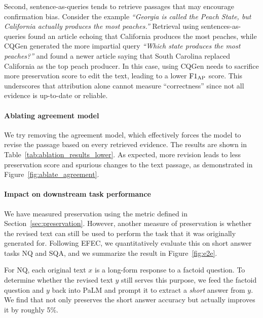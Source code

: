 Second, sentence-as-queries tends to retrieve passages that may encourage confirmation bias. 
Consider the example \textit{``Georgia is called the Peach State, but California actually produces the most peaches.''} Retrieval using sentences-as-queries found an article echoing that California produces the most peaches, while CQGen generated the more impartial query \textit{``Which state produces the most peaches?''} and found a newer article saying that South Carolina replaced California as the top peach producer. In this case, \approach{} using CQGen needs to sacrifice more preservation score to edit the text, leading to a lower $\text{F1}_\text{AP}{}$ score. This underscores that attribution alone cannot measure ``correctness'' since not all evidence is up-to-date or reliable.

\paragraph{Ablating agreement model}
We try removing the agreement model, which effectively forces the model to revise the passage based on every retrieved evidence. The results are shown in Table~\ref{tab:ablation_results_lower}. As expected, more revision leads to less preservation score and spurious changes to the text passage, as demonstrated in Figure~\ref{fig:ablate_agreement}. %













\paragraph{Impact on downstream task performance}\label{sec:e2e_eval}
We have measured preservation using the metric defined in Section~\ref{sec:preservation}. However, another measure of preservation is whether the revised text can still be used to perform the task that it was originally generated for. 
Following EFEC,
we quantitatively evaluate this on short answer tasks NQ and SQA, and we summarize the result in Figure~\ref{fig:e2e}.

For NQ, each original text $x$ is a long-form response to a factoid question. To determine whether the revised text $y$ still serves this purpose, we feed the factoid question and $y$ back into PaLM and prompt it to extract a \emph{short} answer from $y$.
We find that \approach{} not only preserves the short answer accuracy but actually improves it by roughly 5\%.

